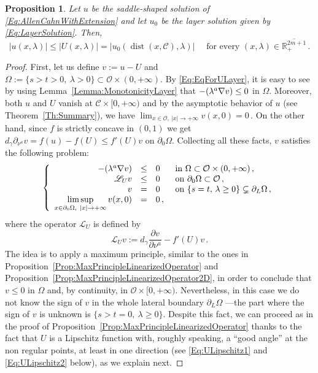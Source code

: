 \documentclass[12pt,reqno]{amsart}
\newtheorem{proposition}[theorem]{Proposition}
\theoremstyle{definition}
\theoremstyle{remark}
\newcommand{\con}[1]{\mathbb{#1}}
\newcommand{\R}{\con{R}} %
\newcommand{\ccal}{\mathscr{C}}
\newcommand{\ocal}{\mathcal{O}}
\newcommand{\s}{\gamma}
\newcommand\beqc[1]{\left\{\begin{array}{#1}}
\newcommand\eeqc{\end{array} \right.}
\def\PDEsystem{rcll}
\DeclareMathOperator{\dist}{dist}
\let\div\relax
\DeclareMathOperator{\div}{div}
\def\ds{\displaystyle}
\numberwithin{equation}{section}
\begin{document}
\begin{proposition}
\label{Prop:SaddleUnderLayer}
Let $u$ be the saddle-shaped solution of \eqref{Eq:AllenCahnWithExtension} and let $u_0$ be the layer solution given by \eqref{Eq:LayerSolution}. Then, 
\begin{equation}
\label{Eq:SaddleUnderLayer}
|u(x,\lambda)| \leq |U(x,\lambda)| = |u_0 ( \dist(x, \ccal), \lambda) | \quad \text{ for every } (x,\lambda)\in \overline{\R^{2m+1}_+}\,.
\end{equation}
\end{proposition}

\begin{proof}
First, let us define $v:= u - U$ and $\Omega := \{s>t>0, \ \lambda > 0\} \subset \ocal \times (0, +\infty)$. By \eqref{Eq:EqForULayer}, it is easy to see by using Lemma~\ref{Lemma:MonotonicityLayer} that $-\div (\lambda^a \nabla v) \leq 0$ in $\Omega$. Moreover, both $u$ and $U$ vanish at $\ccal \times [0,+\infty)$ and by the asymptotic behavior of $u$ (see Theorem~\ref{Th:Summary}), we have $\lim_{x\in  \ocal,\ |x|\to +\infty} v(x,0) = 0\,$. On the other hand, since $f$ is strictly concave in $(0,1)$ we get $d_\s \partial_{\nu^a} v = f(u) - f(U) \leq f'(U)v$ on $\partial_0 \Omega$. Collecting all these facts, $v$ satisfies the following problem:
$$
\beqc{\PDEsystem}
-\div(\lambda^a \nabla v) &\leq& 0 & \text{ in } \Omega \subset \ocal \times (0,+\infty)\,, \\
\mathscr{L}_U v &\leq & 0 & \text{ on } \partial_0 \Omega \subset \ocal \,, \\
v & = & 0 & \text{ on } \{s=t,\, \lambda \geq 0\}\subsetneq\partial_L \Omega \,,\\
\ds \limsup_{x\in \partial_0 \Omega, \ |x|\to +\infty} v(x,0) & = & 0\,,
\eeqc
$$
where the operator $\mathscr{L}_U$ is defined by 
$$
\mathscr{L}_U v := d_\s \dfrac{\partial v}{\partial \nu^a}  -f'(U) v \,.
$$
The idea is to apply a maximum principle, similar to the ones in Proposition~\ref{Prop:MaxPrincipleLinearizedOperator} and Proposition~\ref{Prop:MaxPrincipleLinearizedOperator2D}, in order to conclude that $v\leq 0$ in $\Omega$ and, by continuity, in $\ocal\times[0,+\infty)$. Nevertheless, in this case we do not know the sign of $v$ in the whole lateral boundary $\partial_L \Omega$ ---the part where the sign of $v$ is unknown is $\{s > t= 0,\ \lambda \geq 0\}$. 
Despite this fact, we can proceed as in the proof of Proposition~\ref{Prop:MaxPrincipleLinearizedOperator} thanks to the fact that $U$ is a Lipschitz function with, roughly speaking, a ``good angle'' at the non regular points, at least in one direction (see \eqref{Eq:ULipschitz1} and \eqref{Eq:ULipschitz2} below), as we explain next.



\end{proof}
\end{document}
